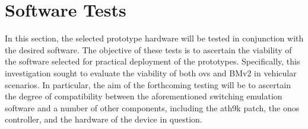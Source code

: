 \chapter{Software Tests}
\label{cha:software_tests}

In this section, the selected prototype hardware will be tested in conjunction with the desired software. The objective of these tests is to ascertain the viability of the software selected for practical deployment of the prototypes. Specifically, this investigation sought to evaluate the viability of both \gls{ovs} and BMv2 in vehicular scenarios. In particular, the aim of the forthcoming testing will be to ascertain the degree of compatibility between the aforementioned switching emulation software and a number of other components, including the ath9k patch, the \gls{onos} controller, and the hardware of the device in question.


